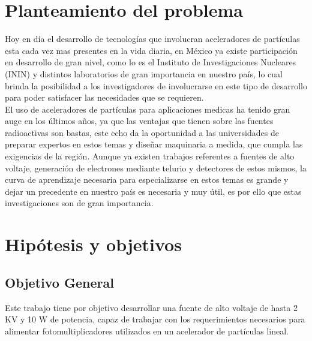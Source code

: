 
\section{Planteamiento del problema}
Hoy en día el desarrollo de tecnologías que involucran aceleradores de partículas esta cada vez mas presentes en la vida diaria, en México ya existe participación en desarrollo de gran nivel, como lo es el Instituto de Investigaciones Nucleares (ININ) y distintos laboratorios de gran importancia en nuestro país, lo cual brinda la posibilidad a los investigadores de involucrarse en este tipo de desarrollo para poder satisfacer las necesidades
que se requieren.\\

El uso de aceleradores de partículas para aplicaciones medicas ha tenido gran auge en los últimos años, ya que las ventajas que tienen sobre las fuentes radioactivas son bastas, este echo da la oportunidad a las universidades de preparar expertos en estos temas y diseñar maquinaria a medida, que cumpla las exigencias de la región. Aunque ya existen trabajos referentes a fuentes de alto voltaje, generación de electrones mediante telurio y detectores de estos mismos, la curva de aprendizaje necesaria para especializarse en estos temas es grande y dejar un precedente en nuestro país es necesaria y muy útil, es por ello que estas
investigaciones son de gran importancia.
\section{Hipótesis y objetivos}

\subsection{Objetivo General}

Este trabajo tiene por objetivo desarrollar una fuente de alto voltaje de hasta 2 KV y 10 W de potencia, capaz de trabajar con los requerimientos necesarios para alimentar fotomultiplicadores utilizados en un acelerador de partículas lineal.


